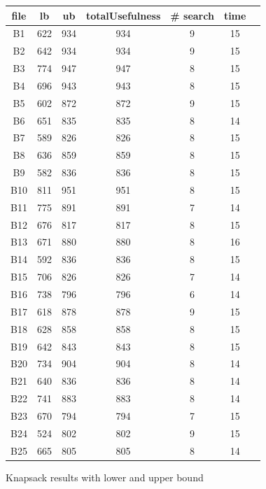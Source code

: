 \documentclass[a4paper ,12pt,french]{article}
\begin{document}
\begin{figure}[!h]
\begin{tabular}{|c|c|c|c|c|c|c|}
\hline
file&lb&ub&totalUsefulness&\# search&time\\
\hline
\hline
B1&622&934&934&9&15\\ \hline
B2&642&934&934&9&15\\ \hline
B3&774&947&947&8&15\\ \hline
B4&696&943&943&8&15\\ \hline
B5&602&872&872&9&15\\ \hline
B6&651&835&835&8&14\\ \hline
B7&589&826&826&8&15\\ \hline
B8&636&859&859&8&15\\ \hline
B9&582&836&836&8&15\\ \hline
B10&811&951&951&8&15\\ \hline
B11&775&891&891&7&14\\ \hline
B12&676&817&817&8&15\\ \hline
B13&671&880&880&8&16\\ \hline
B14&592&836&836&8&15\\ \hline
B15&706&826&826&7&14\\ \hline
B16&738&796&796&6&14\\ \hline
B17&618&878&878&9&15\\ \hline
B18&628&858&858&8&15\\ \hline
B19&642&843&843&8&15\\ \hline
B20&734&904&904&8&14\\ \hline
B21&640&836&836&8&14\\ \hline
B22&741&883&883&8&14\\ \hline
B23&670&794&794&7&15\\ \hline
B24&524&802&802&9&15\\ \hline
B25&665&805&805&8&14\\ \hline
\end{tabular}
\caption{Knapsack results with lower and upper bound}
\label{LUB}
\end{figure}
\end{document}
